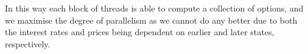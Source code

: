 In this way each block of threads is able to compute a
collection of options, and we maximise the degree of
parallelism as we cannot do any better due to both the
interest rates and prices being dependent on earlier and
later states, respectively.








